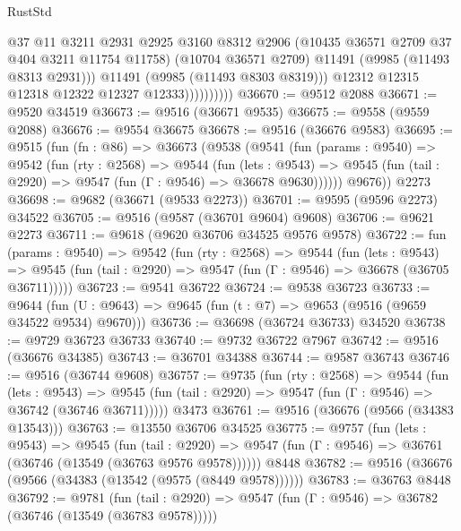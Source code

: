 \begin{lexlean}{RustStd}
\begin{coremodule}
                            @37
                            @11
                            @3211
                            @2931
                            @2925
                            @3160
                            @8312
                            @2906
                            (@10435 @36571 @2709 @37 @404 @3211 @11754 @11758)
                            (@10704 @36571 @2709)
                            @11491
                            (@9985 (@11493 @8313 @2931)))
                          @11491
                          (@9985 (@11493 @8303 @8319)))
                        @12312
                        @12315
                        @12318
                        @12322
                        @12327
                        @12333))))))))))
@36670 := @9512 @2088
@36671 := @9520 @34519
@36673 := @9516 (@36671 @9535)
@36675 := @9558 (@9559 @2088)
@36676 := @9554 @36675
@36678 := @9516 (@36676 @9583)
@36695 := @9515
    (fun (fn : @86) =>
    @36673
      (@9538
        (@9541
          (fun (params : @9540) =>
          @9542
            (fun (rty : @2568) =>
            @9544
              (fun (lets : @9543) =>
              @9545 (fun (tail : @2920) => @9547 (fun (Γ : @9546) => @36678 @9630))))))
        @9676))
    @2273
@36698 := @9682 (@36671 (@9533 @2273))
@36701 := @9595 (@9596 @2273) @34522
@36705 := @9516 (@9587 (@36701 @9604) @9608)
@36706 := @9621 @2273
@36711 := @9618 (@9620 @36706 @34525 @9576 @9578)
@36722 := fun (params : @9540) =>
  @9542
    (fun (rty : @2568) =>
    @9544
      (fun (lets : @9543) =>
      @9545 (fun (tail : @2920) => @9547 (fun (Γ : @9546) => @36678 (@36705 @36711)))))
@36723 := @9541 @36722
@36724 := @9538 @36723
@36733 := @9644
    (fun (U : @9643) => @9645 (fun (t : @7) => @9653 (@9516 (@9659 @34522 @9534) @9670)))
@36736 := @36698 (@36724 @36733) @34520
@36738 := @9729 @36723 @36733
@36740 := @9732 @36722 @7967
@36742 := @9516 (@36676 @34385)
@36743 := @36701 @34388
@36744 := @9587 @36743
@36746 := @9516 (@36744 @9608)
@36757 := @9735
    (fun (rty : @2568) =>
    @9544
      (fun (lets : @9543) =>
      @9545 (fun (tail : @2920) => @9547 (fun (Γ : @9546) => @36742 (@36746 @36711)))))
    @3473
@36761 := @9516 (@36676 (@9566 (@34383 @13543)))
@36763 := @13550 @36706 @34525
@36775 := @9757
    (fun (lets : @9543) =>
    @9545
      (fun (tail : @2920) =>
      @9547 (fun (Γ : @9546) => @36761 (@36746 (@13549 (@36763 @9576 @9578))))))
    @8448
@36782 := @9516 (@36676 (@9566 (@34383 (@13542 (@9575 (@8449 @9578))))))
@36783 := @36763 @8448
@36792 := @9781
    (fun (tail : @2920) => @9547 (fun (Γ : @9546) => @36782 (@36746 (@13549 (@36783 @9578)))))

\end{coremodule}
\end{lexlean}
